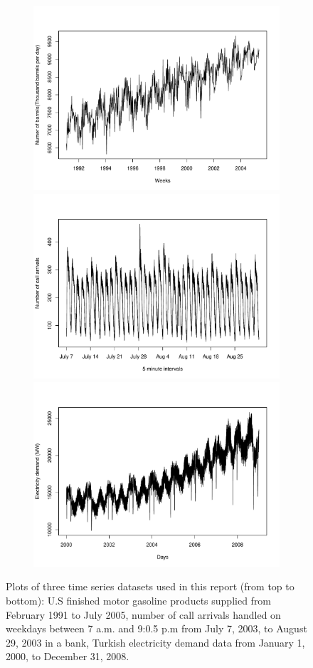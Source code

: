 \documentclass{uwstat572}
\begin{document}
\begin{figure}[]
\minipage{\textwidth}
  \includegraphics[width=6in,height=2.7in]{gas}
\endminipage\hfill
\minipage{\textwidth}
  \includegraphics[width=6in,height=2.7in]{calls}
\endminipage\hfill
\minipage{\textwidth}
  \includegraphics[width=6in,height=2.7in]{telec}
\endminipage
\caption{Plots of three time series datasets used in this report (from top to bottom): U.S finished motor gasoline products supplied from February 1991 to July 2005, number of call arrivals handled on weekdays between 7 a.m. and 9:0.5 p.m from July 7, 2003, to August 29, 2003 in a bank, Turkish electricity demand data from January 1, 2000, to December 31, 2008.}
\label{fig:data}
\end{figure}
\end{document}

